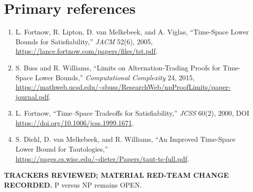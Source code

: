 \documentclass[11pt]{article}
\begin{document}
\section*{Primary references}
\begin{enumerate}
  \item L. Fortnow, R. Lipton, D. van Melkebeek, and A. Viglas, ``Time-Space Lower Bounds for Satisfiability,'' \emph{JACM} 52(6), 2005, \url{https://lance.fortnow.com/papers/files/tst.pdf}.
  \item S. Buss and R. Williams, ``Limits on Alternation-Trading Proofs for Time-Space Lower Bounds,'' \emph{Computational Complexity} 24, 2015, \url{https://mathweb.ucsd.edu/~sbuss/ResearchWeb/npProofLimits/paper-journal.pdf}.
  \item L. Fortnow, ``Time--Space Tradeoffs for Satisfiability,'' \emph{JCSS} 60(2), 2000, DOI \url{https://doi.org/10.1006/jcss.1999.1671}.
  \item S. Diehl, D. van Melkebeek, and R. Williams, ``An Improved Time-Space Lower Bound for Tautologies,'' \url{https://pages.cs.wisc.edu/~dieter/Papers/taut-ts-full.pdf}.
\end{enumerate}

\textbf{TRACKERS REVIEWED; MATERIAL RED-TEAM CHANGE RECORDED.}  P versus NP remains OPEN.

\end{document}

